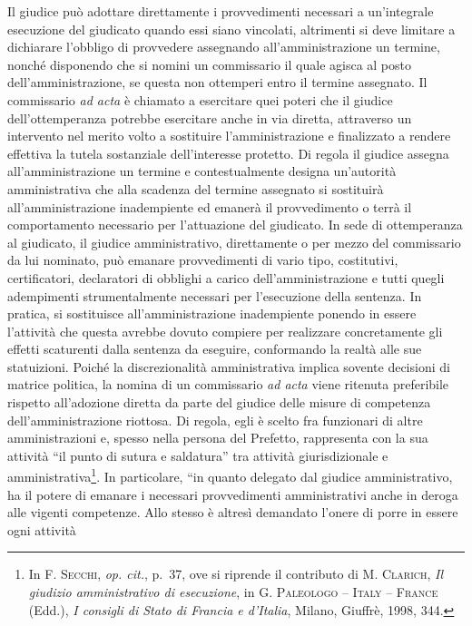 \documentclass[12pt,it,a4paper,]{report}
\begin{document}
Il giudice può adottare direttamente i provvedimenti necessari a
un'integrale esecuzione del giudicato quando essi siano vincolati,
altrimenti si deve limitare a dichiarare l'obbligo di provvedere
assegnando all'amministrazione un termine, nonché disponendo che si
nomini un commissario il quale agisca al posto dell'amministrazione, se
questa non ottemperi entro il termine assegnato. Il commissario \emph{ad
acta} è chiamato a esercitare quei poteri che il giudice
dell'ottemperanza potrebbe esercitare anche in via diretta, attraverso
un intervento nel merito volto a sostituire l'amministrazione e
finalizzato a rendere effettiva la tutela sostanziale dell'interesse
protetto. Di regola il giudice assegna all'amministrazione un termine e
contestualmente designa un'autorità amministrativa che alla scadenza del
termine assegnato si sostituirà all'amministrazione inadempiente ed
emanerà il provvedimento o terrà il comportamento necessario per
l'attuazione del giudicato. In sede di ottemperanza al giudicato, il
giudice amministrativo, direttamente o per mezzo del commissario da lui
nominato, può emanare provvedimenti di vario tipo, costitutivi,
certificatori, declaratori di obblighi a carico dell'amministrazione e
tutti quegli adempimenti strumentalmente necessari per l'esecuzione
della sentenza. In pratica, si sostituisce all'amministrazione
inadempiente ponendo in essere l'attività che questa avrebbe dovuto
compiere per realizzare concretamente gli effetti scaturenti dalla
sentenza da eseguire, conformando la realtà alle sue statuizioni. Poiché
la discrezionalità amministrativa implica sovente decisioni di matrice
politica, la nomina di un commissario \emph{ad acta} viene ritenuta
preferibile rispetto all'adozione diretta da parte del giudice delle
misure di competenza dell'amministrazione riottosa. Di regola, egli è
scelto fra funzionari di altre amministrazioni e, spesso nella persona
del Prefetto, rappresenta con la sua attività ``il punto di sutura e
saldatura'' tra attività giurisdizionale e amministrativa\footnote{In
  \textsc{F. Secchi}, \emph{op. cit.}, p.~37, ove si riprende il
  contributo di M. \textsc{Clarich}, \emph{Il giudizio amministrativo di
  esecuzione}, in G. \textsc{Paleologo} -- \textsc{Italy} --
  \textsc{France} (Edd.), \emph{I consigli di Stato di Francia e
  d'Italia}, Milano, Giuffrè, 1998, 344.}. In particolare, ``in quanto
delegato dal giudice amministrativo, ha il potere di emanare i necessari
provvedimenti amministrativi anche in deroga alle vigenti competenze.
Allo stesso è altresì demandato l'onere di porre in essere ogni attività
\end{document}
